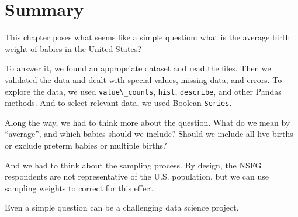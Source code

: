 \hypertarget{summary}{%
\section{Summary}\label{summary}}

This chapter poses what seems like a simple question: what is the
average birth weight of babies in the United States?

To answer it, we found an appropriate dataset and read the files. Then
we validated the data and dealt with special values, missing data, and
errors. To explore the data, we used
\passthrough{\lstinline!value\_counts!}, \passthrough{\lstinline!hist!},
\passthrough{\lstinline!describe!}, and other Pandas methods. And to
select relevant data, we used Boolean \passthrough{\lstinline!Series!}.

Along the way, we had to think more about the question. What do we mean
by ``average'', and which babies should we include? Should we include
all live births or exclude preterm babies or multiple births?

And we had to think about the sampling process. By design, the NSFG
respondents are not representative of the U.S. population, but we can
use sampling weights to correct for this effect.

Even a simple question can be a challenging data science project.

